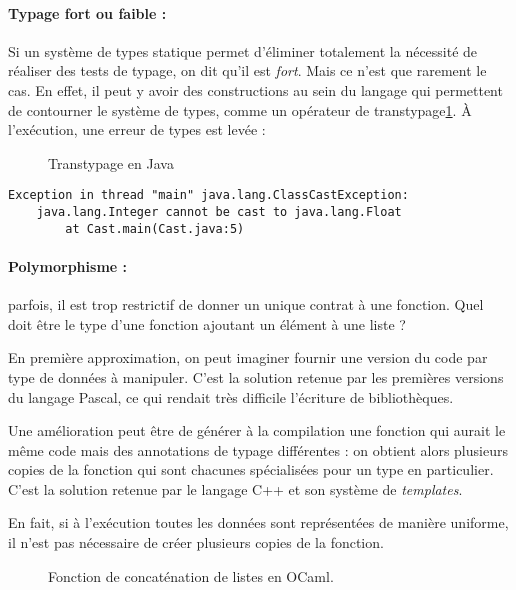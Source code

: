 \paragraph{Typage fort ou faible :}

Si un système de types statique permet d'éliminer totalement la nécessité de
réaliser des tests de typage, on dit qu'il est \emph{fort}. Mais ce n'est que
rarement le cas. En effet, il peut y avoir des constructions au sein du langage
qui permettent de contourner le système de types, comme un opérateur de
transtypage\ref{fig:javacast}. À l'exécution, une erreur de types est levée :

\begin{figure}
  \caption{Transtypage en Java}
  \label{fig:javacast}
\end{figure}

\begin{Verbatim}
Exception in thread "main" java.lang.ClassCastException:
    java.lang.Integer cannot be cast to java.lang.Float
        at Cast.main(Cast.java:5)
\end{Verbatim}

\paragraph{Polymorphisme :} parfois, il est trop restrictif de donner un unique
contrat à une fonction. Quel doit être le type d'une fonction ajoutant un
élément à une liste ?

En première approximation, on peut imaginer fournir une version du code par type
de données à manipuler. C'est la solution retenue par les premières versions du
langage Pascal, ce qui rendait très difficile l'écriture de
bibliothèques\cite{PascalNoEscape}.

Une amélioration peut être de générer à la compilation une fonction qui aurait
le même code mais des annotations de typage différentes : on obtient alors
plusieurs copies de la fonction qui sont chacunes spécialisées pour un type en
particulier. C'est la solution retenue par le langage C++ et son système de
\emph{templates}.

En fait, si à l'exécution toutes les données sont représentées de manière
uniforme, il n'est pas nécessaire de créer plusieurs copies de la fonction.

\begin{figure}
  \caption{Fonction de concaténation de listes en OCaml.}
  \label{fig:listappend}
\end{figure}

